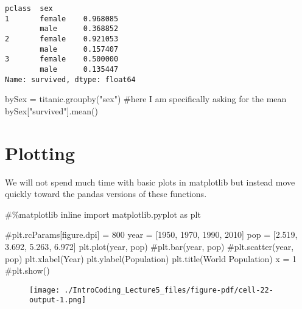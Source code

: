 \documentclass[
  letterpaper,
  DIV=11,
  numbers=noendperiod]{scrreprt}
\newenvironment{Shaded}{\begin{snugshade}}{\end{snugshade}}
\newcommand{\CommentTok}[1]{\textcolor[rgb]{0.37,0.37,0.37}{#1}}
\newcommand{\DecValTok}[1]{\textcolor[rgb]{0.68,0.00,0.00}{#1}}
\newcommand{\FloatTok}[1]{\textcolor[rgb]{0.68,0.00,0.00}{#1}}
\newcommand{\ImportTok}[1]{\textcolor[rgb]{0.00,0.46,0.62}{#1}}
\newcommand{\NormalTok}[1]{\textcolor[rgb]{0.00,0.23,0.31}{#1}}
\newcommand{\OperatorTok}[1]{\textcolor[rgb]{0.37,0.37,0.37}{#1}}
\newcommand{\StringTok}[1]{\textcolor[rgb]{0.13,0.47,0.30}{#1}}
\begin{document}
\begin{verbatim}
pclass  sex   
1       female    0.968085
        male      0.368852
2       female    0.921053
        male      0.157407
3       female    0.500000
        male      0.135447
Name: survived, dtype: float64
\end{verbatim}

\begin{Shaded}
\begin{Highlighting}[]
\NormalTok{bySex }\OperatorTok{=}\NormalTok{ titanic.groupby(}\StringTok{"sex"}\NormalTok{)}
\CommentTok{\#here I am specifically asking for the mean}
\NormalTok{bySex[}\StringTok{"survived"}\NormalTok{].mean()}
\end{Highlighting}
\end{Shaded}

\hypertarget{plotting}{%
\section{Plotting}\label{plotting}}

We will not spend much time with basic plots in matplotlib but instead
move quickly toward the pandas versions of these functions.

\begin{Shaded}
\begin{Highlighting}[]
\CommentTok{\#\%matplotlib inline}
\ImportTok{import}\NormalTok{ matplotlib.pyplot }\ImportTok{as}\NormalTok{ plt}

\CommentTok{\#plt.rcParams[\textquotesingle{}figure.dpi\textquotesingle{}] = 800}
\NormalTok{year }\OperatorTok{=}\NormalTok{ [}\DecValTok{1950}\NormalTok{, }\DecValTok{1970}\NormalTok{, }\DecValTok{1990}\NormalTok{, }\DecValTok{2010}\NormalTok{]}
\NormalTok{pop }\OperatorTok{=}\NormalTok{ [}\FloatTok{2.519}\NormalTok{, }\FloatTok{3.692}\NormalTok{, }\FloatTok{5.263}\NormalTok{, }\FloatTok{6.972}\NormalTok{]}
\NormalTok{plt.plot(year, pop)}
\CommentTok{\#plt.bar(year, pop)}
\CommentTok{\#plt.scatter(year, pop)}
\NormalTok{plt.xlabel(}\StringTok{\textquotesingle{}Year\textquotesingle{}}\NormalTok{)}
\NormalTok{plt.ylabel(}\StringTok{\textquotesingle{}Population\textquotesingle{}}\NormalTok{)}
\NormalTok{plt.title(}\StringTok{\textquotesingle{}World Population\textquotesingle{}}\NormalTok{)}
\NormalTok{x }\OperatorTok{=} \DecValTok{1}
\CommentTok{\#plt.show()}
\end{Highlighting}
\end{Shaded}

\begin{figure}[H]

{\centering \texttt{[image: ./IntroCoding\_Lecture5\_files/figure-pdf/cell-22-output-1.png]}

}

\end{figure}
\end{document}
